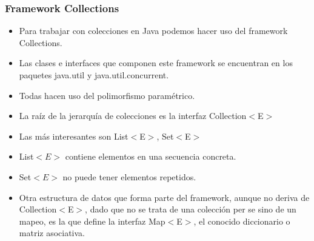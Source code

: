 \documentclass{beamer}
\begin{document}
 
\begin{frame}[fragile]
\frametitle{Framework Collections}
\begin{itemize}[<+->]
\item Para trabajar con colecciones en Java podemos hacer uso del framework Collections.
\item Las clases e interfaces que componen este framework se encuentran en los paquetes java.util y java.util.concurrent.
\item Todas hacen uso del polimorfismo paramétrico. 
\item La raíz de la jerarquía de colecciones es la interfaz Collection$<$E$>$
\item Las más interesantes son List$<$E$>$, Set$<$E$>$ 
\item List$<E>$ contiene elementos en una secuencia concreta.
\item Set$<E>$ no puede tener elementos repetidos.
\item Otra estructura de datos que forma parte del framework, aunque no deriva de Collection$<$E$>$, dado que no se trata de una colección per se sino de un mapeo, es la que define la interfaz Map$<$E$>$, el conocido diccionario o matriz asociativa.
\end{itemize}
\end{frame}
\end{document}
